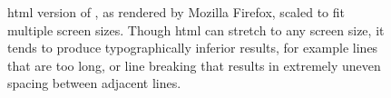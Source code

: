 \begin{figure}
\begin{center}
\vspace{0.2in}
\hspace{0.01\textwidth}
\end{center}
\caption[A document laid out by Mozilla Firefox]{\gls{html} version of \cite{Pinkney2011}, as rendered by Mozilla Firefox, scaled to fit multiple screen sizes. Though \gls{html} can stretch to any screen size, it tends to produce typographically inferior results, for example lines that are too long, or line breaking that results in extremely uneven spacing between adjacent lines.}
\label{fig:example-html}
\end{figure}

